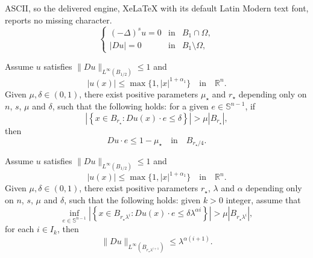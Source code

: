 \documentclass[10pt,a4paper]{amsart}
\begin{document}
ASCII, so the delivered engine, XeLaTeX with its default Latin Modern text font, reports no missing character.
\begin{equation}\label{mainprob}  
\left\{  
\begin{array}{rcl}  
(-\Delta)^s u = 0 & \text{in} & B_1 \cap \Omega, \\  
|Du| = 0 & \text{in} & B_1 \setminus \Omega,  
\end{array}  
\right.  
\end{equation}  

\begin{lemma}\label{reg-at-critical-points-step1} 
Assume $u$ satisfies $\|Du\|_{L^\infty(B_{1/2})} \leq 1$ and
$$
    |u(x)|\leq \max\{1,|x|^{1+\alpha_1}\} \quad \mbox{in} \quad \mathbb{R}^n.
$$
Given $\mu, \delta \in (0,1)$, there exist positive parameters $\mu_\star$ and $r_\star$ depending only on $n$, $s$, $\mu$ and $\delta$, such that the following holds: for a given $e \in \mathbb{S}^{n-1}$, if
$$
    \left|\left\{x \in B_{r_\star} \colon Du(x) \cdot e \leq  \delta \right\} \right| > \mu |B_{r_\star}|,
$$
then
$$
    Du \cdot e \leq 1-\mu_\star \quad \mbox{in} \quad B_{r_\star/4}.
$$
\end{lemma}

\begin{proposition}\label{reg-at-critical-points} 
Assume $u$ satisfies $\|Du\|_{L^\infty(B_{1/2})} \leq 1$ and
$$
    |u(x)|\leq \max\{1,|x|^{1+\alpha_1}\} \quad \mbox{in} \quad \mathbb{R}^n.
$$
Given $\mu, \delta \in (0,1)$, there exist positive parameters $r_\star$, $\lambda$ and $\alpha$ depending only on $n$, $s$, $\mu$ and $\delta$, such that the following holds: given $k>0$ integer, assume that
\begin{equation}\label{positivity every direction}
    \inf_{e \in \mathbb{S}^{n-1}}\left|\left\{x \in B_{r_\star\lambda^i}\colon Du(x) \cdot e \leq \delta \lambda^{\alpha i}  \right\} \right| > \mu |B_{r_\star \lambda^i}|,
\end{equation}
for each $i \in I_k$, then
\begin{equation}\label{boladouro}  \|Du\|_{L^\infty(B_{r_\star \lambda^{i+1}})} \leq \lambda^{\alpha(i+1)}.
\end{equation}
\end{proposition}
\end{document}
